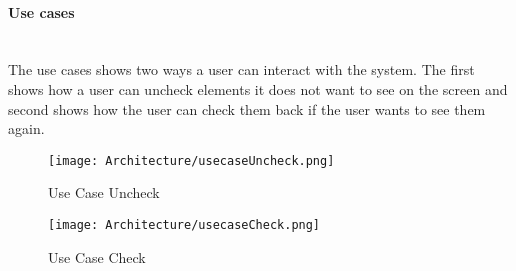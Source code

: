 \documentclass[../document.tex]{subfiles}
\begin{document}
\paragraph{Use cases} \ \\
The use cases shows two ways a user can interact with the system. The first shows how a user can uncheck elements it does not want to see on the screen and second shows how the user can check them back if the user wants to see them again.

\begin{figure}[H]
\centering
\texttt{[image: Architecture/usecaseUncheck.png]}
\caption{Use Case Uncheck}
\end{figure}

\begin{figure}[H]
\centering
\texttt{[image: Architecture/usecaseCheck.png]}
\caption{Use Case Check}
\end{figure}
\end{document}
